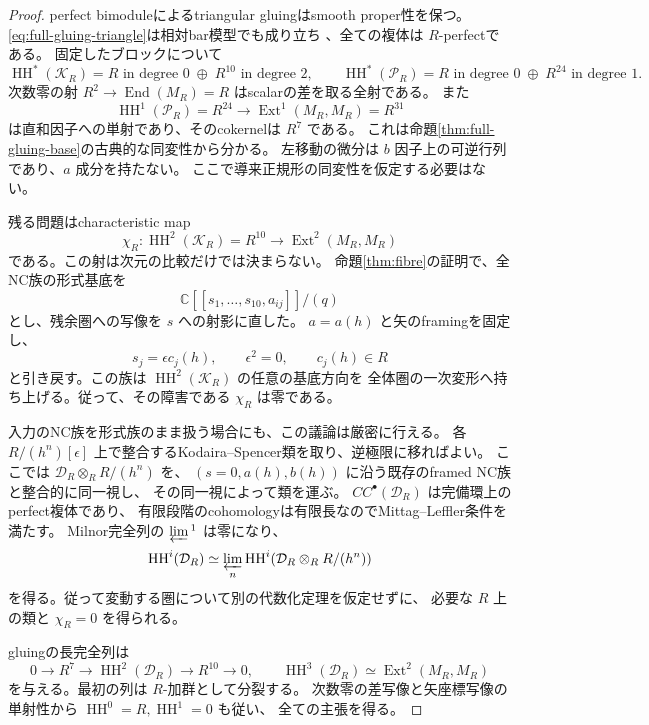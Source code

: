 \documentclass[a4paper,11pt]{ltjsarticle}
\theoremstyle{definition}
\newcommand{\CC}{\mathbb C}
\newcommand{\HH}{\operatorname{HH}}
\newcommand{\Ext}{\operatorname{Ext}}
\begin{document}
\begin{proof}
perfect bimoduleによるtriangular gluingはsmooth proper性を保つ。
\eqref{eq:full-gluing-triangle}は相対bar模型でも成り立ち
\cite[Theorem 7.7, Remark 7.8]{Kuz}、全ての複体は $R$-perfectである。
固定したブロックについて
\[
 \HH^*(\mathcal K_R)=R\text{ in degree }0\;\oplus\;R^{10}\text{ in degree }2,
 \qquad
 \HH^*(\mathcal P_R)=R\text{ in degree }0\;\oplus\;R^{24}\text{ in degree }1.
\]
次数零の射 $R^2\to\operatorname{End}(M_R)=R$ はscalarの差を取る全射である。
また
\[
 \HH^1(\mathcal P_R)=R^{24}\longrightarrow\Ext^1(M_R,M_R)=R^{31}
\]
は直和因子への単射であり、そのcokernelは $R^7$ である。
これは命題\ref{thm:full-gluing-base}の古典的な同変性から分かる。
左移動の微分は $b$ 因子上の可逆行列であり、$a$ 成分を持たない。
ここで導来正規形の同変性を仮定する必要はない。

残る問題はcharacteristic map
\begin{equation}\label{eq:gluing-characteristic-arc}
 \chi_R:\HH^2(\mathcal K_R)=R^{10}\longrightarrow\Ext^2(M_R,M_R)
\end{equation}
である。この射は次元の比較だけでは決まらない。
命題\ref{thm:fibre}の証明で、全NC族の形式基底を
\[
 \CC[[s_1,\ldots,s_{10},a_{ij}]]/(q)
\]
とし、残余圏への写像を $s$ への射影に直した。
$a=a(h)$ と矢のframingを固定し、
\[
 s_j=\epsilon c_j(h),\qquad\epsilon^2=0,\qquad c_j(h)\in R
\]
と引き戻す。この族は $\HH^2(\mathcal K_R)$ の任意の基底方向を
全体圏の一次変形へ持ち上げる。従って、その障害である $\chi_R$ は零である。

入力のNC族を形式族のまま扱う場合にも、この議論は厳密に行える。
各 $R/(h^n)[\epsilon]$ 上で整合するKodaira--Spencer類を取り、逆極限に移ればよい。
ここでは $\mathcal D_R\otimes_RR/(h^n)$ を、
$(s=0,a(h),b(h))$ に沿う既存のframed NC族と整合的に同一視し、
その同一視によって類を運ぶ。
$CC^\bullet(\mathcal D_R)$ は完備環上のperfect複体であり、
有限段階のcohomologyは有限長なのでMittag--Leffler条件を満たす。
Milnor完全列の $\varprojlim{}^1$ は零になり、
\[
 \HH^i(\mathcal D_R)\simeq
 \varprojlim_n\HH^i(\mathcal D_R\otimes_RR/(h^n))
\]
を得る。従って変動する圏について別の代数化定理を仮定せずに、
必要な $R$ 上の類と $\chi_R=0$ を得られる。

gluingの長完全列は
\[
 0\longrightarrow R^7\longrightarrow\HH^2(\mathcal D_R)
 \longrightarrow R^{10}\longrightarrow0,
 \qquad
 \HH^3(\mathcal D_R)\simeq\Ext^2(M_R,M_R)
\]
を与える。最初の列は $R$-加群として分裂する。
次数零の差写像と矢座標写像の単射性から $\HH^0=R,\HH^1=0$ も従い、
全ての主張を得る。
\end{proof}
\end{document}
